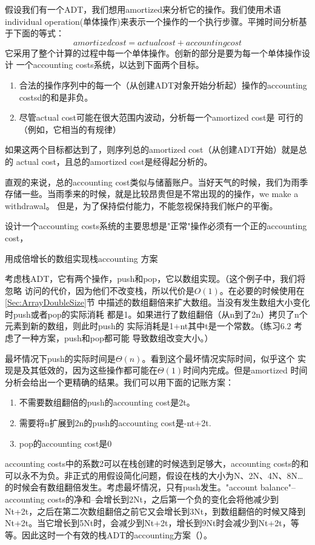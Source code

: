 假设我们有一个ADT，我们想用amortized来分析它的操作。我们使用术语individual
operation(单体操作)来表示一个操作的一个执行步骤。平摊时间分析基于下面的等式：
\begin{equation}
amortized cost= actual cost + accounting cost
\end{equation}
它采用了整个计算的过程中每一个单体操作。创新的部分是要为每一个单体操作设计
一个accounting costs系统，以达到下面两个目标。
\begin{enumerate}
\item 合法的操作序列中的每一个（从创建ADT对象开始分析起）操作的accounting
    costsd的和是非负。
\item 尽管actual cost可能在很大范围内波动，分析每一个amortized cost是
    可行的（例如，它相当的有规律）
\end{enumerate}
如果这两个目标都达到了，则序列总的amortized cost（从创建ADT开始）就是总的
actual cost，且总的amortized cost是经得起分析的。

直观的来说，总的accounting cost类似与储蓄账户。当好天气的时候，我们为雨季
存储一些。当雨季来的时候，就是比较昂贵但是不常出现的的操作，we make a withdrawal。
但是，为了保持偿付能力，不能忽视保持我们帐户的平衡。

设计一个accounting costs系统的主要思想是"正常"操作必须有一个正的accounting cost，

\begin{example}
用成倍增长的数组实现栈accounting 方案

考虑栈ADT，它有两个操作，push和pop，它以数组实现。（这个例子中，我们将忽略
访问的代价，因为他们不改变栈，所以代价是$O(1)$。在必要的时候使用在\ref{Sec:ArrayDoubleSize}节
中描述的数组翻倍来扩大数组。当没有发生数组大小变化时push或者pop的实际消耗
都是1。如果进行了数组翻倍（从n到了2n）拷贝了n个元素到新的数组，则此时push的
实际消耗是1+nt其中t是一个常数。（练习6.2 考虑了一种方案，push和pop都可能
导致数组改变大小。）

最坏情况下push的实际时间是$\Theta(n)$。看到这个最坏情况实际时间，似乎这个
实现是及其低效的，因为这些操作都可能在$\Theta(1)$时间内完成。但是amortized
时间分析会给出一个更精确的结果。我们可以用下面的记账方案：
\begin{enumerate}
\item 不需要数组翻倍的push的accounting cost是2t。
\item 需要将n扩展到2n的push的accounting cost是-nt+2t.
\item pop的accounting cost是0
\end{enumerate}
accounting costs中的系数2可以在栈创建的时候选到足够大，accounting costs的和可以永不为负。非正式的用假设简化问题，假设在栈的大小为N、2N、4N、8N…的时候会有数组翻倍发生。考虑最坏情况，只有push发生。"account balance"--accounting costs的净和--会增长到2Nt，之后第一个负的变化会将他减少到Nt+2t，之后在第二次数组翻倍之前它又会增长到3Nt，到数组翻倍的时候又降到Nt+2t。当它增长到5Nt时，会减少到Nt+2t，增长到9Nt时会减少到Nt+2t，等等。因此这时一个有效的栈ADT的accounting方案（）。

\end{example}

